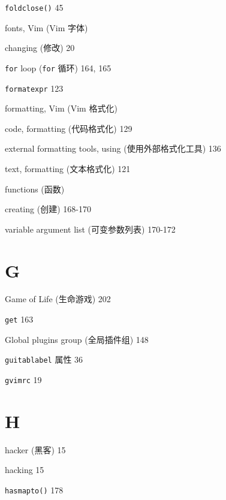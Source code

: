 \begin{multicols}{2}
\hangindent=2pc  \texttt{foldclose()} 45

\hangindent=2pc  fonts, Vim (Vim 字体) \par
\hangindent=2pc \quad changing (修改) 20 \par

\hangindent=2pc  \texttt{for} loop (\texttt{for} 循环) 164, 165

\hangindent=2pc  \texttt{formatexpr} 123

\hangindent=2pc  formatting, Vim (Vim 格式化) \par
\hangindent=2pc \quad code, formatting (代码格式化) 129 \par
\hangindent=2pc \quad external formatting tools, using (使用外部格式化工具) 136 \par
\hangindent=2pc \quad text, formatting (文本格式化) 121 \par

\hangindent=2pc  functions (函数) \par
\hangindent=2pc \quad creating (创建) 168-170 \par
\hangindent=2pc \quad variable argument list (可变参数列表) 170-172 \par

\hangindent=2pc  \section*{G}

\hangindent=2pc  Game of Life (生命游戏) 202

\hangindent=2pc  \texttt{get} 163

\hangindent=2pc  Global plugins group (全局插件组) 148

\hangindent=2pc  \texttt{guitablabel} 属性 36

\hangindent=2pc  \texttt{gvimrc} 19

\hangindent=2pc  \section*{H}

\hangindent=2pc  hacker (黑客) 15

\hangindent=2pc  hacking 15

\hangindent=2pc  \texttt{hasmapto()} 178


\end{multicols}

